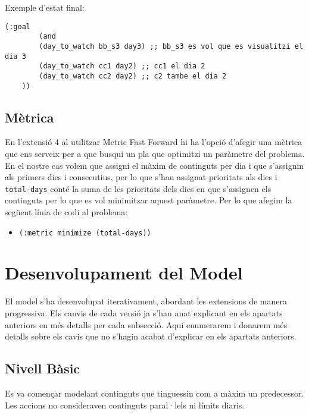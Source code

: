 \documentclass[a4paper]{article}
\begin{document}
	Exemple d’estat final:
	
	\begin{lstlisting}[language=PDDL, caption={Exemple de \textit{goal} del problema}, label={lst:goal_problema}]
	(:goal
		(and
		(day_to_watch bb_s3 day3) ;; bb_s3 es vol que es visualitzi el dia 3
		(day_to_watch cc1 day2) ;; cc1 el dia 2
		(day_to_watch cc2 day2) ;; c2 tambe el dia 2
	))
	\end{lstlisting}
	
	\subsection{Mètrica}
	
	En l'extensió 4 al utilitzar Metric Fast Forward hi ha l'opció d'afegir una mètrica que ens serveix per a que busqui un pla que optimitzi un paràmetre del problema. En el nostre cas volem que assigni el màxim de continguts per dia i que s'assignin als primers dies i consecutius, per lo que s'han assignat prioritats als dies i \texttt{total-days} conté la suma de les prioritats dels dies en que s'assignen els continguts per lo que es vol minimitzar aquest paràmetre. Per lo que afegim la següent línia de codi al problema:
	
	\begin{itemize}[label={}, leftmargin=1.5em, itemsep=0pt]
		\item \texttt{(:metric minimize (total-days))} 
	\end{itemize}
	
	
	
	
	\newpage
	\section{Desenvolupament del Model}
	
	El model s'ha desenvolupat iterativament, abordant les extensions de manera progressiva. Els canvis de cada versió ja s'han anat explicant en els apartats anteriors en més detalls per cada subsecció. Aquí enumerarem i donarem més detalls sobre els cavis que no s'hagin acabat d'explicar en els apartats anteriors.
	
	\subsection{Nivell Bàsic}
	
	Es va començar modelant continguts que tinguessin com a màxim un predecessor. Les accions no consideraven continguts paral·lels ni límits diaris.
	
\end{document}
